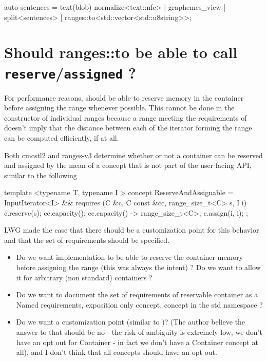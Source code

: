 \documentclass{wg21}
\newcommand{\cc}[1]{\texttt{#1}}
\begin{document}
\begin{codeblock}
    auto sentences =
        text(blob)
        normalize<text::nfc> |
        graphemes_view |
        split<sentences> | ranges::to<std::vector<std::u8string>>;
\end{codeblock}


\section{Should ranges::to be able to call \cc{reserve}/\cc{assigned} ?}

For performance reasons,  should be able to reserve memory in the container before assigning the range whenever possible.
This cannot be done in the constructor of individual ranges because a range meeting the requirements of  
doesn't imply that the distance between each of the iterator forming the range can be computed efficiently, if at all. 

Both cmcstl2 and ranges-v3 determine whether or not a container can be reserved and assigned by the mean of a  concept that is not part of the user facing API, similar to the following


\begin{codeblock}
template <typename T, typename I >
concept ReserveAndAssignable = 
	InputIterator<I> && requires (C &c, C const &cc, range_size_t<C> s, I i) {
		c.reserve(s);
		cc.capacity();
		{ cc.capacity() } -> range_size_t<C>;
		c.assign(i, i);
};
\end{codeblock}

LWG made the case that there should be a customization point for this behavior and that the set of requirements should be specified.

\begin{itemize}
\item Do we want implementation to be able to reserve the container memory before assigning the range (this was always the intent) ? Do we want to allow it for arbitrary (non standard) containers ?


\item Do we want to document the set of requirements of reservable container as a Named requirements, exposition only concept, concept in the std namespace ?
\item Do we want a customization point (similar to )? (The author believe the answer to that should be no - the risk of ambiguity is extremely low, we don't have an opt out for Container - in fact we don't have a Container concept at all), and I don't think that all concepts should have an opt-out.
\end{itemize}
\end{document}
